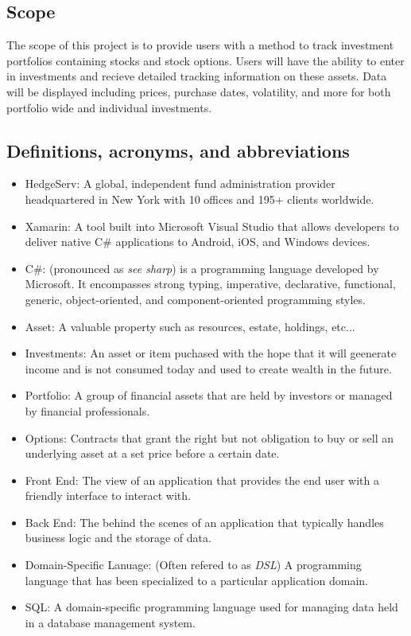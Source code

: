 \documentclass[onecolumn, draftclsnofoot,10pt, compsoc]{IEEEtran}
\begin{document}
\subsection{Scope}
The scope  of this project is to provide users with a method to track investment portfolios containing stocks and stock options. Users will have
the ability  to enter in investments and recieve detailed tracking information on these assets. Data will be displayed including prices, purchase
dates, volatility, and more for both portfolio wide and individual investments.

\subsection{Definitions, acronyms, and abbreviations}
\begin{itemize}
	\item HedgeServ: A global, independent fund administration provider headquartered in New York with
		10 offices and 195+ clients worldwide.
	\item Xamarin: A tool built into Microsoft Visual Studio that allows developers to deliver native 
	   	C\# applications to Android, iOS, and Windows devices.
	\item C\#: (pronounced as \textit{see sharp}) is a programming language developed by Microsoft. It encompasses strong typing, imperative, declarative, functional, generic,
		object-oriented, and component-oriented programming styles.
	\item Asset: A valuable property such as resources, estate, holdings, etc...
	\item Investments: An asset or item puchased with the hope that it will geenerate income and is not consumed today and used to create wealth in the future.
	\item Portfolio: A group of financial assets that are held by investors or managed by financial professionals.
	\item Options: Contracts that grant the right but not obligation to buy or sell an underlying asset at a set price before a certain date.
	\item Front End: The view of an application that provides the end user with a friendly interface to interact with.
	\item Back End: The behind the scenes of an application that typically handles business logic and the storage of data.
	\item Domain-Specific Lanuage: (Often refered to as \textit{DSL}) A programming language that has been specialized to a particular application domain.
	\item SQL: A domain-specific programming language used for managing data held in a database management system.
\end{itemize}
\end{document}
